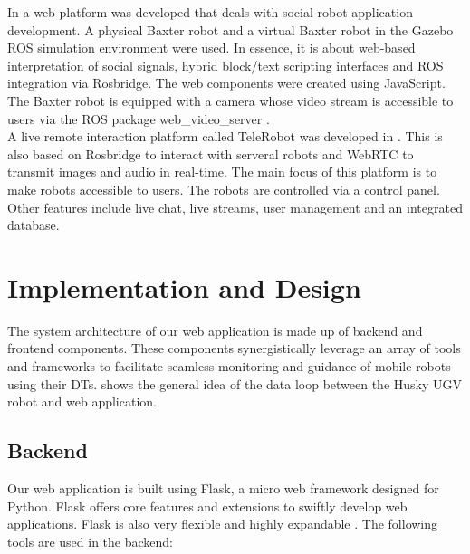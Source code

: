 \documentclass[conference]{IEEEtran}
\begin{document}
In \cite{johnson} a web platform was developed that deals with social robot application development. A physical Baxter robot and a virtual Baxter robot in the Gazebo ROS simulation environment were used. In essence, it is about web-based interpretation of social signals, hybrid block/text scripting interfaces and ROS integration via Rosbridge. 
The web components were created using JavaScript. The Baxter robot is equipped with a camera whose video stream is accessible to users via the ROS package web\_video\_server \cite{webvideoserver}.\\
A live remote interaction platform called TeleRobot was developed in \cite{wang}. This is also based on Rosbridge to interact with serveral robots and WebRTC to transmit images and audio in real-time. The main focus of this platform is to make robots accessible to users. The robots are controlled via a control panel. Other features include live chat, live streams, user management and an integrated database.

\section{Implementation and Design}
The system architecture of our web application is made up of backend and frontend components. These components synergistically leverage an array of tools and frameworks to facilitate seamless monitoring and guidance of mobile robots using their DTs.  shows the general idea of the data loop between the Husky UGV robot \cite{huskyClearpath} and  web application.

\subsection{Backend}
Our web application is built using Flask, a micro web framework designed for Python.
Flask offers core features and extensions to swiftly develop web applications. Flask is also very flexible and highly expandable \cite{flasksqlite}. The following tools are used in the backend:
\end{document}
